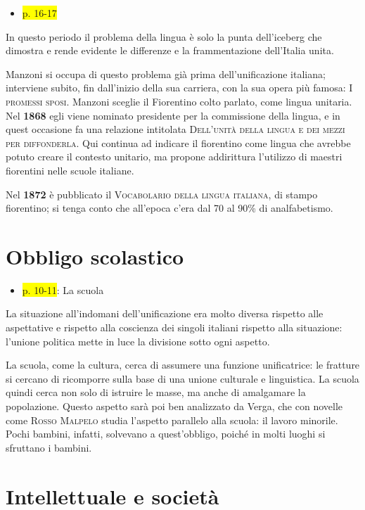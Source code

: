 \documentclass{book}
\newcommand{\pagine}[1]{\colorbox{yellow}{#1}}
\newcounter{mar}
\begin{document}
\begin{itemize}
\item
  \pagine{p. 16-17}
\end{itemize}

In questo periodo il problema della lingua è solo la punta dell'iceberg
che dimostra e rende evidente le differenze e la frammentazione
dell'Italia unita.

Manzoni si occupa di questo problema già prima dell'unificazione
italiana; interviene subito, fin dall'inizio della sua carriera, con la
sua opera più famosa: \textsc{I promessi sposi}. Manzoni sceglie il
Fiorentino colto parlato, come lingua unitaria. Nel \textbf{1868} egli
viene nominato presidente per la commissione della lingua, e in quest
occasione fa una relazione intitolata \textsc{Dell'unità della lingua e
dei mezzi per diffonderla}. Qui continua ad indicare il fiorentino come
lingua che avrebbe potuto creare il contesto unitario, ma propone
addirittura l'utilizzo di maestri fiorentini nelle scuole italiane.

Nel \textbf{1872} è pubblicato il \textsc{Vocabolario della lingua italiana},
di stampo fiorentino; si tenga conto che all'epoca c'era dal 70 al 90\%
di analfabetismo.

\section{Obbligo scolastico}

\begin{itemize}

\item
  \pagine{p. 10-11}: La scuola
\end{itemize}

La situazione all'indomani dell'unificazione era molto diversa rispetto
alle aspettative e rispetto alla coscienza dei singoli italiani rispetto
alla situazione: l'unione politica mette in luce la divisione sotto ogni
aspetto.

La scuola, come la cultura, cerca di assumere una funzione unificatrice:
le fratture si cercano di ricomporre sulla base di una unione culturale
e linguistica. La scuola quindi cerca non solo di istruire le masse, ma
anche di amalgamare la popolazione. Questo aspetto sarà poi ben
analizzato da Verga, che con novelle come \textsc{Rosso Malpelo} studia
l'aspetto parallelo alla scuola: il lavoro minorile. Pochi bambini,
infatti, solvevano a quest'obbligo, poiché in molti luoghi si sfruttano
i bambini.

\section{Intellettuale e società}
\end{document}
